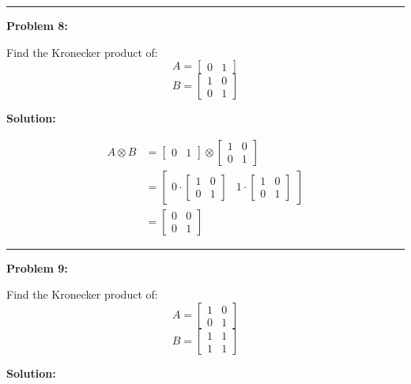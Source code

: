 \documentclass[
  letterpaper,
  DIV=11,
  numbers=noendperiod]{scrreprt}
\theoremstyle{plain}
\theoremstyle{definition}
\theoremstyle{remark}
\begin{document}
\begin{center}\rule{0.5\linewidth}{0.5pt}\end{center}

\textbf{Problem 8:}

Find the Kronecker product of: \[A=\begin{bmatrix}0&1\end{bmatrix}\]
\[B=\begin{bmatrix}1&0\\0&1\end{bmatrix}\]

\textbf{Solution:}

\begin{align*}
A \otimes B &= \begin{bmatrix}0&1\end{bmatrix} \otimes \begin{bmatrix}1&0\\0&1\end{bmatrix} \\
&= \begin{bmatrix}
0 \cdot \begin{bmatrix}1&0\\0&1\end{bmatrix} & 1 \cdot \begin{bmatrix}1&0\\0&1\end{bmatrix}
\end{bmatrix} \\
&= \begin{bmatrix}
0 & 0 \\
0 & 1
\end{bmatrix}
\end{align*}

\begin{center}\rule{0.5\linewidth}{0.5pt}\end{center}

\textbf{Problem 9:}

Find the Kronecker product of:
\[A=\begin{bmatrix}1&0\\0&1\end{bmatrix}\]
\[B=\begin{bmatrix}1&1\\1&1\end{bmatrix}\]

\textbf{Solution:}
\end{document}
